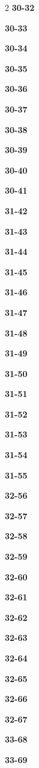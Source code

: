 \documentclass[10pt,a4paper]{article}
\begin{document}
\begin{multicols}{2}
\noindent\textbf{30-32}\ \par
\noindent\textbf{30-33}\ \par
\noindent\textbf{30-34}\ \par
\noindent\textbf{30-35}\ \par
\noindent\textbf{30-36}\ \par
\noindent\textbf{30-37}\ \par
\noindent\textbf{30-38}\ \par
\noindent\textbf{30-39}\ \par
\noindent\textbf{30-40}\ \par
\noindent\textbf{30-41}\ \par
\noindent\textbf{31-42}\ \par
\noindent\textbf{31-43}\ \par
\noindent\textbf{31-44}\ \par
\noindent\textbf{31-45}\ \par
\noindent\textbf{31-46}\ \par
\noindent\textbf{31-47}\ \par
\noindent\textbf{31-48}\ \par
\noindent\textbf{31-49}\ \par
\noindent\textbf{31-50}\ \par
\noindent\textbf{31-51}\ \par
\noindent\textbf{31-52}\ \par
\noindent\textbf{31-53}\ \par
\noindent\textbf{31-54}\ \par
\noindent\textbf{31-55}\ \par
\noindent\textbf{32-56}\ \par
\noindent\textbf{32-57}\ \par
\noindent\textbf{32-58}\ \par
\noindent\textbf{32-59}\ \par
\noindent\textbf{32-60}\ \par
\noindent\textbf{32-61}\ \par
\noindent\textbf{32-62}\ \par
\noindent\textbf{32-63}\ \par
\noindent\textbf{32-64}\ \par
\noindent\textbf{32-65}\ \par
\noindent\textbf{32-66}\ \par
\noindent\textbf{32-67}\ \par
\noindent\textbf{33-68}\ \par
\noindent\textbf{33-69}\ \par

\end{multicols}
\end{document}
